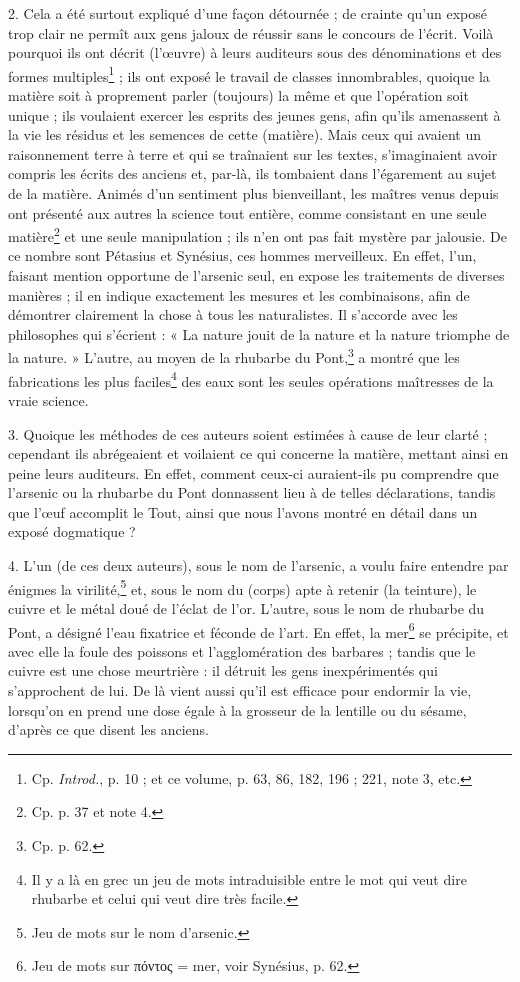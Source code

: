 \documentclass[a4paper, 11pt, oneside, polutonikogreek, french]{article}
\begin{document}
2. Cela a été surtout expliqué d'une façon détournée ; de crainte qu'un exposé trop clair ne permît aux gens jaloux de réussir sans le concours de l'écrit. Voilà pourquoi ils ont décrit (l'œuvre) à leurs auditeurs sous des dénominations et des formes multiples\footnote{Cp. \emph{Introd.}, p. 10 ; et ce volume, p. 63, 86, 182, 196 ; 221, note 3, etc.} ; ils ont exposé le travail de classes innombrables, quoique la matière soit à proprement parler (toujours) la même et que l'opération soit unique ; ils voulaient exercer les esprits des jeunes gens, afin qu'ils amenassent à la vie les résidus et les semences de cette (matière). Mais ceux qui avaient un raisonnement terre à terre et qui se traînaient sur les textes, s'imaginaient avoir compris les écrits des anciens et, par-là, ils tombaient dans l'égarement au sujet de la matière. Animés d'un sentiment plus bienveillant, les maîtres venus depuis ont présenté aux autres la science tout entière, comme consistant en une seule matière\footnote{Cp. p. 37 et note 4.} et une seule manipulation ; ils n'en ont pas fait mystère par jalousie. De ce nombre sont Pétasius et Synésius, ces hommes merveilleux. En effet, l'un, faisant mention opportune de l'arsenic seul, en expose les traitements de diverses manières ; il en indique exactement les mesures et les combinaisons, afin de démontrer clairement la chose à tous les naturalistes. Il s'accorde avec les philosophes qui s'écrient : « La nature jouit de la nature et la nature triomphe de la nature. » L'autre, au moyen de la rhubarbe du Pont,\footnote{Cp. p. 62.} a montré que les fabrications les plus faciles\footnote{Il y a là en grec un jeu de mots intraduisible entre le mot qui veut dire rhubarbe et celui qui veut dire très facile.} des eaux sont les seules opérations maîtresses de la vraie science.

3. Quoique les méthodes de ces auteurs soient estimées à cause de leur clarté ; cependant ils abrégeaient et voilaient ce qui concerne la matière, mettant ainsi en peine leurs auditeurs. En effet, comment ceux-ci auraient-ils pu comprendre que l'arsenic ou la rhubarbe du Pont donnassent lieu à de telles déclarations, tandis que l'œuf accomplit le Tout, ainsi que nous l'avons montré en détail dans un exposé dogmatique ?

4. L'un (de ces deux auteurs), sous le nom de l'arsenic, a voulu faire entendre par énigmes la virilité,\footnote{Jeu de mots sur le nom d'arsenic.} et, sous le nom du (corps) apte à retenir (la teinture), le cuivre et le métal doué de l'éclat de l'or. L'autre, sous le nom de rhubarbe du Pont, a désigné l'eau fixatrice et féconde de l'art. En effet, la mer\footnote{Jeu de mots sur πόντος = mer, voir Synésius, p. 62.} se précipite, et avec elle la foule des poissons et l'agglomération des barbares ; tandis que le cuivre est une chose meurtrière : il détruit les gens inexpérimentés qui s'approchent de lui. De là vient aussi qu'il est efficace pour endormir la vie, lorsqu'on en prend une dose égale à la grosseur de la lentille ou du sésame, d'après ce que disent les anciens.
\end{document}
